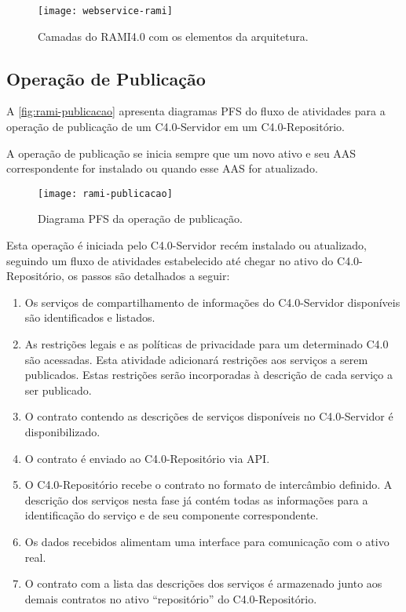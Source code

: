 	\begin{figure}[H]
		\centering
		\label{fig:webservice-rami}
		\texttt{[image: webservice-rami]}
		\caption{Camadas do RAMI4.0 com os elementos da arquitetura.}
	\end{figure}

\subsection{Operação de Publicação}

	A \autoref{fig:rami-publicacao} apresenta diagramas PFS do fluxo de atividades para a operação de publicação de um C4.0-Servidor em um C4.0-Repositório.
	
	A operação de publicação se inicia sempre que um novo ativo e seu AAS correspondente for instalado ou quando esse AAS for atualizado.
	
	\begin{figure}[htb]
		\centering
		\label{fig:rami-publicacao}
		\texttt{[image: rami-publicacao]}
		\caption{Diagrama PFS da operação de publicação.}
	\end{figure}

	Esta operação é iniciada pelo C4.0-Servidor recém instalado ou atualizado, seguindo um fluxo de atividades estabelecido até chegar no ativo do C4.0-Repositório, os passos são detalhados a seguir:
	
	\begin{enumerate}
		
		\item Os serviços de compartilhamento de informações do C4.0-Servidor disponíveis são identificados e listados.
		
		\item As restrições legais e as políticas de privacidade para um determinado C4.0 são acessadas. Esta atividade adicionará restrições aos serviços a serem publicados. Estas restrições serão incorporadas à descrição de cada serviço a ser publicado.
		
		\item O contrato contendo as descrições de serviços disponíveis no C4.0-Servidor é disponibilizado.
		
		\item O contrato é enviado ao C4.0-Repositório via API. 
		
		\item O C4.0-Repositório recebe o contrato no formato de intercâmbio definido. A descrição dos serviços nesta fase já contém todas as informações para a identificação do serviço e de seu componente correspondente.
		
		\item Os dados recebidos alimentam uma interface para comunicação com o ativo real.
		
		\item O contrato com a lista das descrições dos serviços é armazenado junto aos demais contratos no ativo ``repositório'' do C4.0-Repositório.
		
	\end{enumerate}


